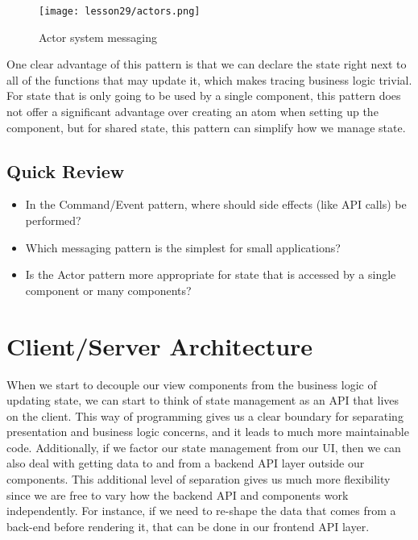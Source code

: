 \documentclass[10pt,twoside,openright]{memoir}
\begin{document}
\begin{figure}[H]
\caption{Actor system messaging}
\centering
\texttt{[image: lesson29/actors.png]}
\end{figure}

One clear advantage of this pattern is that we can declare the state
right next to all of the functions that may update it, which makes
tracing business logic trivial. For state that is only going to be used
by a single component, this pattern does not offer a significant
advantage over creating an atom when setting up the component, but for
shared state, this pattern can simplify how we manage state.


\subsection{Quick Review}

\begin{itemize}
\tightlist
\item
  In the Command/Event pattern, where should side effects (like API
  calls) be performed?
\item
  Which messaging pattern is the simplest for small applications?
\item
  Is the Actor pattern more appropriate for state that is accessed by a
  single component or many components?
\end{itemize}


\section{Client/Server Architecture}

When we start to decouple our view components from the business logic of
updating state, we can start to think of state management as an API that
lives on the client. This way of programming gives us a clear boundary
for separating presentation and business logic concerns, and it leads to
much more maintainable code. Additionally, if we factor our state
management from our UI, then we can also deal with getting data to and
from a backend API layer outside our components. This additional level
of separation gives us much more flexibility since we are free to vary
how the backend API and components work independently. For instance, if
we need to re-shape the data that comes from a back-end before rendering
it, that can be done in our frontend API layer.
\end{document}
